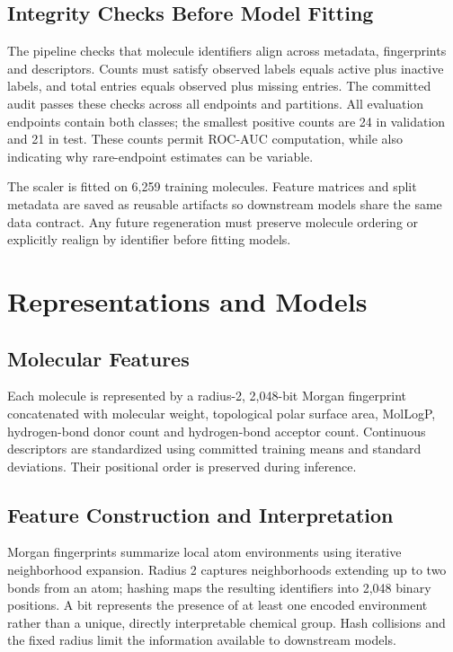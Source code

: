 \documentclass[conference]{IEEEtran}
\begin{document}
\subsection{Integrity Checks Before Model Fitting}
The pipeline checks that molecule identifiers align across metadata, fingerprints and descriptors. Counts must satisfy observed labels equals active plus inactive labels, and total entries equals observed plus missing entries. The committed audit passes these checks across all endpoints and partitions. All evaluation endpoints contain both classes; the smallest positive counts are 24 in validation and 21 in test. These counts permit ROC-AUC computation, while also indicating why rare-endpoint estimates can be variable.

The scaler is fitted on 6,259 training molecules. Feature matrices and split metadata are saved as reusable artifacts so downstream models share the same data contract. Any future regeneration must preserve molecule ordering or explicitly realign by identifier before fitting models.


\section{Representations and Models}
\subsection{Molecular Features}
Each molecule is represented by a radius-2, 2,048-bit Morgan fingerprint concatenated with molecular weight, topological polar surface area, MolLogP, hydrogen-bond donor count and hydrogen-bond acceptor count. Continuous descriptors are standardized using committed training means and standard deviations. Their positional order is preserved during inference.


\subsection{Feature Construction and Interpretation}
Morgan fingerprints summarize local atom environments using iterative neighborhood expansion. Radius 2 captures neighborhoods extending up to two bonds from an atom; hashing maps the resulting identifiers into 2,048 binary positions. A bit represents the presence of at least one encoded environment rather than a unique, directly interpretable chemical group. Hash collisions and the fixed radius limit the information available to downstream models.
\end{document}
